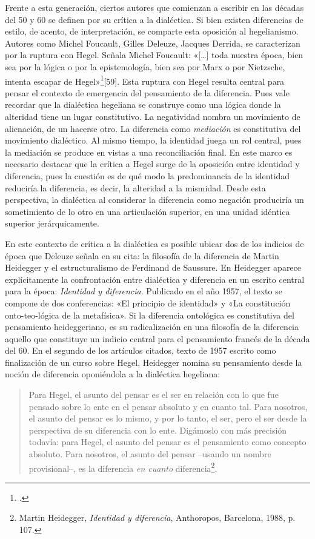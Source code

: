 Frente a esta generación, ciertos autores que comienzan a escribir en las décadas del 50 y 60 se definen por su crítica a la dialéctica. Si bien existen diferencias de estilo, de acento, de interpretación, se comparte esta oposición al hegelianismo. Autores como Michel Foucault, Gilles Deleuze, Jacques Derrida, se caracterizan por la ruptura con Hegel. Señala Michel Foucault: «{[}\ldots{]} toda nuestra época, bien sea por la lógica o por la epistemología, bien sea por Marx o por Nietzsche, intenta escapar de Hegel»\footcite{@2566-FOUCAULT1983}[59]. Esta ruptura con Hegel resulta central para pensar el contexto de emergencia del pensamiento de la diferencia. Pues vale recordar que la dialéctica hegeliana se construye como una lógica donde la alteridad tiene un lugar constitutivo. La negatividad nombra un movimiento de alienación, de un hacerse otro. La diferencia como \emph{mediación} es constitutiva del movimiento dialéctico. Al mismo tiempo, la identidad juega un rol central, pues la mediación se produce en vistas a una reconciliación final. En este marco es necesario destacar que la crítica a Hegel surge de la oposición entre identidad y diferencia, pues la cuestión es de qué modo la predominancia de la identidad reduciría la diferencia, es decir, la alteridad a la mismidad. Desde esta perspectiva, la dialéctica al considerar la diferencia como negación produciría un sometimiento de lo otro en una articulación superior, en una unidad idéntica superior jerárquicamente.

En este contexto de crítica a la dialéctica es posible ubicar dos de los indicios de época que Deleuze señala en su cita: la filosofía de la diferencia de Martin Heidegger y el estructuralismo de Ferdinand de Saussure. En Heidegger aparece explícitamente la confrontación entre dialéctica y diferencia en un escrito central para la época: \emph{Identidad y diferencia}. Publicado en el año 1957, el texto se compone de dos conferencias: «El principio de identidad» y «La constitución onto-teo-lógica de la metafísica». Si la diferencia ontológica es constitutiva del pensamiento heideggeriano, es su radicalización en una filosofía de la diferencia aquello que constituye un indicio central para el pensamiento francés de la década del 60. En el segundo de los artículos citados, texto de 1957 escrito como finalización de un curso sobre Hegel, Heidegger nomina su pensamiento desde la noción de diferencia oponiéndola a la dialéctica hegeliana:

\begin{quote}
Para Hegel, el asunto del pensar es el ser en relación con lo que fue pensado sobre lo ente en el pensar absoluto y en cuanto tal. Para nosotros, el asunto del pensar es lo mismo, y por lo tanto, el ser, pero el ser desde la perspectiva de su diferencia con lo ente. Digámoslo con más precisión todavía: para Hegel, el asunto del pensar es el pensamiento como concepto absoluto. Para nosotros, el asunto del pensar --usando un nombre provisional--, es la diferencia \emph{en cuanto} diferencia\footnote{Martin Heidegger, \emph{Identidad y diferencia}, Anthoropos, Barcelona, 1988, p. 107.}.
\end{quote}

